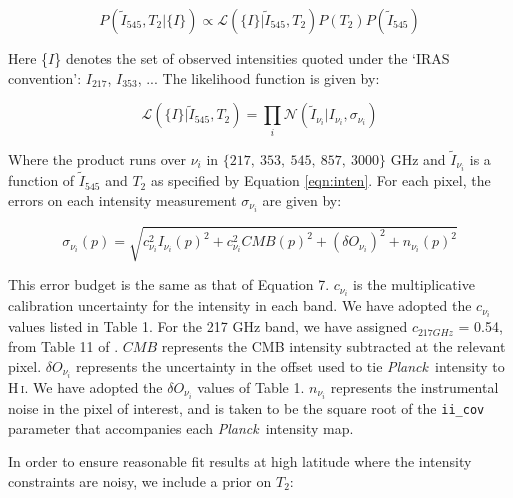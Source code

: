 \documentclass{emulateapj}
\newcommand{\PLANCK}{{\it Planck}}
\begin{document}
\begin{equation}
\label{eqn:post}
P(\tilde{I}_{545}, T_2|\{I\}) \propto \mathcal{L}(\{I\}|\tilde{I}_{545}, T_2)P(T_2)P(\tilde{I}_{545})
\end{equation}


Here \{$I$\} denotes the set of observed intensities quoted under
the `IRAS convention': $I_{217}$, $I_{353}$, ... The likelihood function is 
given by:

\begin{equation} \label{equ:like}
\mathcal{L}(\{I\}|\tilde{I}_{545}, T_2) = \displaystyle\prod\limits_{i}\mathcal{N}(\tilde{I}_{\nu_{i}}|I_{\nu_{i}}, \sigma_{\nu_i})
\end{equation}


Where the product runs over $\nu_i$ in $\{217,\ 353,\ 545,\ 857,\ 3000\}$ GHz
and $\tilde{I}_{\nu_i}$ is a function of $\tilde{I}_{545}$ and $T_2$ as 
specified by Equation \ref{eqn:inten}. For each pixel, the errors on each 
intensity measurement $\sigma_{\nu_i}$ are given by:

\begin{equation}
\sigma_{\nu_i}(p) = \sqrt{c^2_{\nu_i}I_{\nu_i}(p)^2 + c^2_{\nu_i}CMB(p)^2 + (\delta O_{\nu_i})^2 + n_{\nu_i}(p)^2}
\end{equation}


This error budget is the same as that of \cite{planckdust} Equation 7. 
$c_{\nu_i}$ is the multiplicative calibration uncertainty for the intensity in 
each band. We have adopted the $c_{\nu_i}$ values listed in \cite{planckdust} 
Table 1. For the 217 GHz band, we have assigned $c_{217 GHz}$ = 0.54, from 
Table 11 of \cite{planckcalib}. $CMB$ represents the CMB intensity 
subtracted at the relevant pixel. $\delta O_{\nu_i}$ represents the uncertainty
in the offset used to tie \PLANCK~intensity to H\,\textsc{i}. We have adopted 
the  $\delta O_{\nu_i}$ values of \cite{planckdust} Table 1. $n_{\nu_i}$ 
represents the instrumental noise in the pixel of interest, and is taken to be 
the square root of the \verb|ii_cov| parameter that accompanies each 
\PLANCK~intensity map.

In order to ensure reasonable fit results at high latitude where the intensity 
constraints are noisy, we include a prior on $T_2$:
\end{document}

